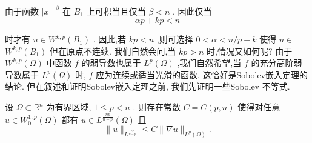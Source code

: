 \documentclass[lang=cn,newtx,10pt,scheme=chinese,thmcnt=chapter]{elegantbook}
\begin{document}
由于函数 \({\left| x\right| }^{-\beta }\) 在 \({B}_{1}\) 上可积当且仅当 \(\beta  < n\) . 因此仅当
\begin{equation*}
{\alpha p} + {kp} < n
\end{equation*}

时才有 \(u \in  {W}^{k,p}\left( {B}_{1}\right)\) . 因此,若 \({kp} < n\) ,则可选择 \(0 < \alpha  < n/p - k\) 使得 \(u \in\)  \({W}^{k,p}\left( {B}_{1}\right)\) 但在原点不连续. 我们自然会问,当 \({kp} > n\) 时,情况又如何呢? 由于 \({W}^{k,p}\left( \Omega \right)\) 中函数 \(f\) 的弱导数也属于 \({L}^{p}\left( \Omega \right)\) ,我们自然希望,当 \(f\) 的充分高阶弱导数属于 \({L}^{p}\left( \Omega \right)\) 时, \(f\) 应为连续或适当光滑的函数. 这恰好是Sobolev嵌入定理的结论. 但在叙述和证明Sobolev嵌入定理之前, 我们先证明一些Sobolev 不等式.
\begin{lemma}\label{3.4.2}
     设 \(\Omega  \subset  {\mathbb{R}}^{n}\) 为有界区域, \(1 \leqslant  p < n\) . 则存在常数 \(C = C\left( {p,n}\right)\) 使得对任意 \(u \in  {W}_{0}^{1,p}\left( \Omega \right)\) 都有 \(u \in  {L}^{\frac{np}{n - p}}\left( \Omega \right)\) 且
\begin{equation}
\parallel u{\parallel }_{{L}^{\frac{np}{n - p}}} \leqslant  C\parallel \nabla u{\parallel }_{{L}^{p}\left( \Omega \right) }. \label{3.26}
\end{equation}

\end{lemma}
\end{document}
